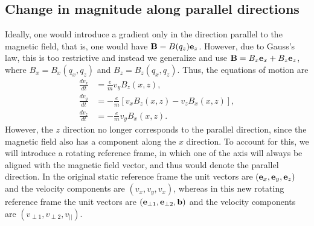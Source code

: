 \documentclass[a4paper,11pt]{report}
\begin{document}
\subsection{Change in magnitude along parallel directions}
Ideally, one would introduce a gradient only in the direction parallel to the magnetic field, that is, one would have $\mathbf{B} = B(q_z) \mathbf{e}_z$. However, due to Gauss's law, this is too restrictive and instead we generalize and use $\mathbf{B} = B_x \mathbf{e}_x + B_z \mathbf{e}_z$, where $B_x = B_x(q_x,q_z)$ and $B_z = B_z(q_x,q_z)$. Thus, the equations of motion are
\begin{align}
    \frac{dv_x}{dt} &= \frac{e}{m} v_y B_z(x,z) , \label{eq:par_grad_vx_inter}\\
    \frac{dv_y}{dt} &= -\frac{e}{m} [v_x B_z(x,z) - v_z B_x(x,z)] , \label{eq:par_grad_vy_inter}\\
    \frac{dv_z}{dt} &= -\frac{e}{m} v_y B_x(x,z) \label{eq:par_grad_vz_inter}.
\end{align}
However, the $z$ direction no longer corresponds to the parallel direction, since the magnetic field also has a component along the $x$ direction. To account for this, we will introduce a rotating reference frame, in which one of the axis will always be aligned with the magnetic field vector, and thus would denote the parallel direction. In the original static reference frame the unit vectors are $(\mathbf{e}_x, \mathbf{e}_y, \mathbf{e}_z)$ and the velocity components are $(v_x, v_y, v_x)$, whereas in this new rotating reference frame the unit vectors are $(\mathbf{e}_{\perp1}, \mathbf{e}_{\perp2}, \mathbf{b})$ and the velocity components are $(v_{\perp1}, v_{\perp2}, v_{||})$. 
\end{document}
